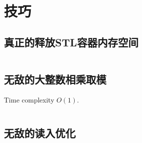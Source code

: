 \chapter{技巧}
\section{真正的释放STL容器内存空间}
\inputminted{cpp}{\source/tricks/truly-release-container-space.cpp}
\section{无敌的大整数相乘取模}
Time complexity $O(1)$.
\inputminted{cpp}{\source/tricks/O1-multiply-mod.cpp}
\section{无敌的读入优化}
\inputminted{cpp}{\source/tricks/unbeatable-input-acceleration.cpp}
